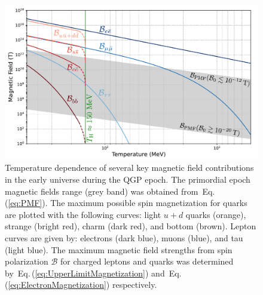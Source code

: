 \documentclass[epjST]{svjour}
\newcommand{\req}[1]{Eq.\,(\ref{#1})}
\begin{document}
\begin{figure}%
\centerline{
\includegraphics[width=0.90\columnwidth]{Figure_1_v3.pdf}}
\caption{\label{Figure_1}Temperature dependence of several key magnetic field contributions in the early universe during the QGP epoch. {\color{blue}The primordial epoch magnetic fields range (grey band) was obtained from~\req{eq:PMF}. The maximum possible spin magnetization for quarks are plotted with the following curves: light \(u+d\) quarks (orange), strange (bright red), charm (dark red), and bottom (brown). Lepton curves are given by: electrons (dark blue), muons (blue), and tau (light blue). The maximum magnetic field strengths from spin polarization \(\mathcal{B}\) for charged leptons and quarks was determined by~\req{eq:UpperLimitMagnetization} and~\req{eq:ElectronMagnetization} respectively.}}
\end{figure}
\end{document}
